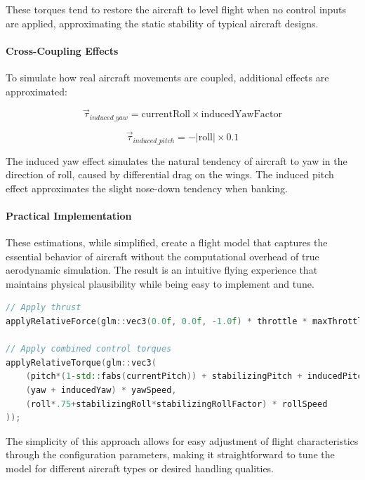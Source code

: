 These torques tend to restore the aircraft to level flight when no control inputs are applied, approximating the static stability of typical aircraft designs.

\paragraph{Cross-Coupling Effects}
To simulate how real aircraft movements are coupled, additional effects are approximated:

\begin{equation}
\vec{\tau}_{induced\_yaw} = \text{currentRoll} \times \text{inducedYawFactor}
\end{equation}

\begin{equation}
\vec{\tau}_{induced\_pitch} = -|\text{roll}| \times 0.1
\end{equation}

The induced yaw effect simulates the natural tendency of aircraft to yaw in the direction of roll, caused by differential drag on the wings. The induced pitch effect approximates the slight nose-down tendency when banking.

\paragraph{Practical Implementation}
These estimations, while simplified, create a flight model that captures the essential behavior of aircraft without the computational overhead of true aerodynamic simulation. The result is an intuitive flying experience that maintains physical plausibility while being easy to implement and tune.

\begin{lstlisting}[language=C++, caption={Force application in update method}, label=src:force_application]
// Apply thrust
applyRelativeForce(glm::vec3(0.0f, 0.0f, -1.0f) * throttle * maxThrottle);

// Apply combined control torques
applyRelativeTorque(glm::vec3(
    (pitch*(1-std::fabs(currentPitch)) + stabilizingPitch + inducedPitch) * pitchSpeed,
    (yaw + inducedYaw) * yawSpeed,
    (roll*.75+stabilizingRoll*stabilizingRollFactor) * rollSpeed
));
\end{lstlisting}

The simplicity of this approach allows for easy adjustment of flight characteristics through the configuration parameters, making it straightforward to tune the model for different aircraft types or desired handling qualities.


